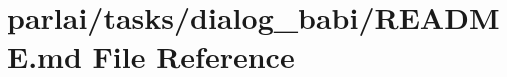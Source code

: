 \hypertarget{parlai_2tasks_2dialog__babi_2README_8md}{}\section{parlai/tasks/dialog\+\_\+babi/\+R\+E\+A\+D\+ME.md File Reference}
\label{parlai_2tasks_2dialog__babi_2README_8md}
